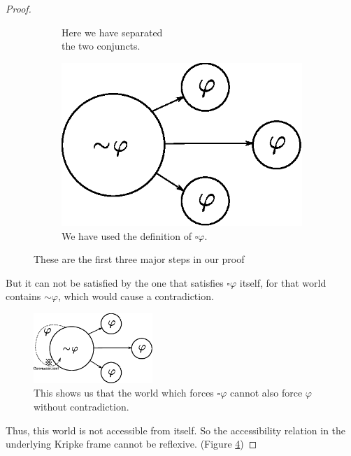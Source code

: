 \documentclass[12pt]{article}
\renewcommand{\phi}{\varphi}
\begin{document}
\begin{proof}
\begin{figure}[h]
\begin{subfigure}{0.27\textwidth}
            \caption{Here we have separated \\ the two conjuncts.}
            \label{Proof Step 2}
        \end{subfigure}
        \begin{subfigure}{0.27\textwidth}
            \centering
            \includegraphics[width=\textwidth]{proof3.eps}
            \caption{We have used the definition of $\square \phi$.}
            \label{Proof Step 3}
        \end{subfigure}
        \caption{These are the first three major steps in our proof}
        \label{Proof Step 1-3}
    \end{figure}
    
    But it can not be satisfied by the one
    that satisfies $\square \phi$ itself, for that world contains $\sim \! \phi$, which would cause a contradiction. 
    \begin{figure}[h]
        \centering
        \includegraphics[width=0.4\textwidth]{proof5.eps}
        \caption{This shows us that the world which forces $\square \phi$ cannot also force $\phi$ without contradiction.}
        \label{Contradiction}
    \end{figure}

    Thus, this world is not accessible from itself. So the accessibility relation in the underlying Kripke frame cannot be reflexive. (Figure \ref{Contradiction})
\end{proof}
\end{document}

